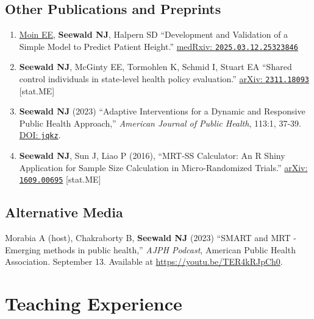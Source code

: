 \documentclass[letterpaper,11pt]{article} %
\begin{document}
	\subsection*{Other Publications and Preprints}
		\begin{enumerate}			
            \item \underline{Moin EE}, \textbf{Seewald NJ}, Halpern SD ``Development and Validation of a Simple Model to Predict Patient Height.'' \href{https://www.medrxiv.org/content/10.1101/2025.03.12.25323846}{medRxiv: \texttt{2025.03.12.25323846}}
            \item \textbf{Seewald NJ}, McGinty EE, Tormohlen K, Schmid I, Stuart EA ``Shared control individuals in state-level health policy evaluation.'' \href{https://arxiv.org/abs/2311.18093}{arXiv: \texttt{2311.18093}} [stat.ME]
			\item \textbf{Seewald NJ} (2023) ``Adaptive Interventions for a Dynamic and Responsive Public Health Approach,'' \textit{American Journal of Public Health}, 113:1, 37-39. \href{https://doi.org/jqkz}{DOI: \texttt{jqkz}}.
		    \item \textbf{Seewald NJ}, Sun J, Liao P (2016), ``MRT-SS Calculator: An R Shiny Application for Sample Size Calculation in Micro-Randomized Trials.'' \href{http://arxiv.org/abs/1609.00695}{arXiv: \texttt{1609.00695}} [stat.ME]
		\end{enumerate}

        \subsection*{Alternative Media}
        \begin{etaremune}
            \item Morabia A (host), Chakraborty B, \textbf{Seewald NJ} (2023) ``SMART and MRT - Emerging methods in public health,'' \textit{AJPH Podcast}, American Public Health Association. September 13. Available at \url{https://youtu.be/TER4kRJpCh0}.
        \end{etaremune}
		
	
	\section*{Teaching Experience}
	
	
\end{document}
